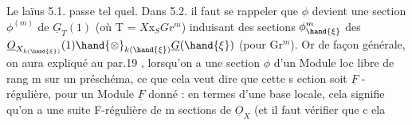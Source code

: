 Le laïus 5.1. passe tel quel. Dans 5.2. il faut se rappeler
que $\phi$ devient une section $\phi^{(m)}$ de $\underline{G}_T(1)$ (où T 
 = $X\mathrm{x}_S Gr^m$)  induisant des sections
$\phi^m_{\hand{\xi}}$ des   $\underline{O}_{X_{k(\hand{\xi})}}(1)\hand{\otimes}_{k(\hand{\xi})}\underline{G}(\hand{\xi})$ (pour \hand{$\xi \in$} Gr$^m$). Or
de façon générale, on aura expliqué au par.19 , lorsqu'on a une
 section $\phi$ d'un Module loc libre de rang m sur un préschéma, ce que
 cela veut dire que cette s ection soit $\underline{F}$ -régulière, pour un Module
 $\underline{F}$ donné : en termes d'une base locale, cela signifie qu'on a une
 suite F-régulière de m sections de $\underline{O}_X$ (et il faut vérifier que c ela

